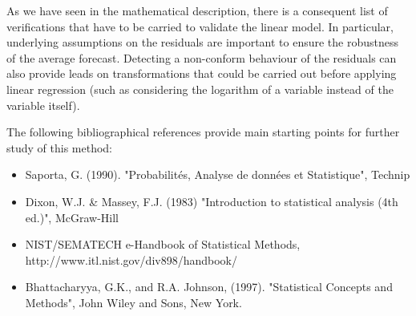             {
              As we have seen in the mathematical description, there is a consequent list of verifications that have to be carried to validate the linear model. In particular, underlying assumptions on the residuals are important to ensure the robustness of the average forecast. Detecting a non-conform behaviour of the residuals can also provide leads on transformations that could be carried out before applying linear regression (such as considering the logarithm of a variable instead of the variable itself).

              The following bibliographical references provide main starting points for further study of this method:
              \begin{itemize}
              \item Saporta, G. (1990). "Probabilités, Analyse de données et Statistique", Technip
              \item Dixon, W.J. \& Massey, F.J. (1983) "Introduction to statistical analysis (4th ed.)", McGraw-Hill
              \item NIST/SEMATECH e-Handbook of Statistical Methods, http://www.itl.nist.gov/div898/handbook/
              \item Bhattacharyya, G.K., and R.A. Johnson, (1997). "Statistical Concepts and Methods", John Wiley and Sons, New York.
            \end{itemize}}
